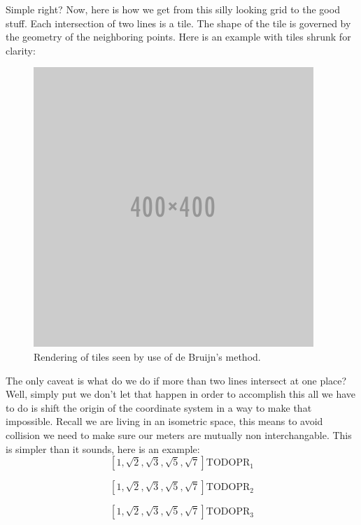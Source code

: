 \documentclass{amsart}
\begin{document}
Simple right? Now, here is how we get from this silly looking grid to the good stuff. Each intersection of two
lines is a tile. The shape of the tile is governed by the geometry of the neighboring points. Here is an example
with tiles shrunk for clarity:

\begin{figure}[h]
  \centering
  \includegraphics[width=0.8\linewidth]{figures/placeholder}
  \caption{Rendering of tiles seen by use of de Bruijn's method.}
  \label{fig:db-vis}
\end{figure}

The only caveat is what do we do if more than two lines intersect at one place? Well, simply put we don’t let that happen in order to accomplish this all we have to do is shift the origin of the coordinate system in a way to make that impossible. Recall we are living in an isometric space, this means to avoid collision we need to make sure our meters are mutually non interchangable. This is simpler than it sounds, here is an example:
\begin{equation}
 \left[1, \sqrt{2}, \sqrt{3}, \sqrt{5}, \sqrt{7}\right] \mathrm{TODO PR_1}
 \label{eq:pr_1}
\end{equation}

\begin{equation}
 \left[1, \sqrt{2}, \sqrt{3}, \sqrt{5}, \sqrt{7}\right] \mathrm{TODO PR_2}
 \label{eq:pr_2}
\end{equation}

\begin{equation}
 \left[1, \sqrt{2}, \sqrt{3}, \sqrt{5}, \sqrt{7}\right] \mathrm{TODO PR_3}
 \label{eq:pr_3}
\end{equation}
\end{document}
